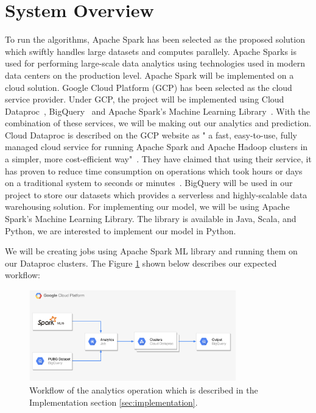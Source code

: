 \documentclass[journal,twoside,web]{ieeecolor}
\begin{document}
\section{System Overview}
\label{sec:system_overivew}
To run the algorithms, Apache Spark has been selected as the proposed solution which swiftly handles large datasets and computes parallely. Apache Sparks is used for performing large-scale data analytics using technologies used in modern data centers on the production level. Apache Spark will be implemented on a cloud solution. Google Cloud Platform (GCP) has been selected as the cloud service provider. Under GCP, the project will be implemented using Cloud Dataproc~\cite{noauthor_dataproc_nodate}, BigQuery~\cite{noauthor_bigquery_nodate} and Apache Spark's Machine Learning Library~\cite{noauthor_mllib_nodate}. With the combination of these services, we will be making out our analytics and prediction. Cloud Dataproc is described on the GCP website as " a fast, easy-to-use, fully managed cloud service for running Apache Spark and Apache Hadoop clusters in a simpler, more cost-efficient way"~\cite{noauthor_dataproc_nodate}. They have claimed that using their service, it has proven to reduce time consumption on operations which took hours or days on a traditional system to seconds or minutes~\cite{noauthor_dataproc_nodate}. BigQuery will be used in our project to store our datasets which provides a serverless and highly-scalable data warehousing solution. For implementing our model, we will be using Apache Spark's Machine Learning Library. The library is available in Java, Scala, and Python, we are interested to implement our model in Python. 

We will be creating jobs using Apache Spark ML library and running them on our Dataproc clusters. The Figure \ref{fig:1} shown below describes our expected workflow:

\begin{figure}[h]
  \includegraphics[width=9cm]{images/flow.pdf}
  \caption{Workflow of the analytics operation which is described in the Implementation section \ref{sec:implementation}.}
  \label{fig:1}
\end{figure}
\end{document}
